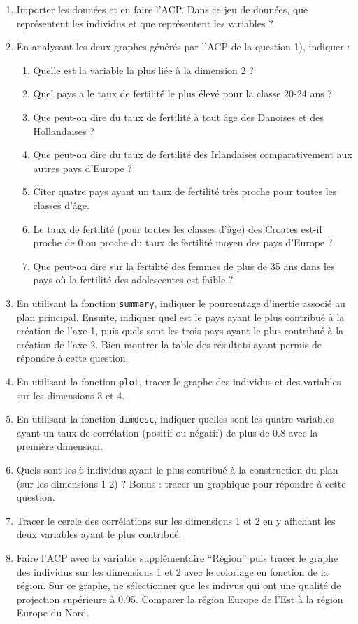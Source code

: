 \documentclass[
]{article}
\begin{document}
\begin{enumerate}
\def\labelenumi{\arabic{enumi})}
\item
  Importer les données et en faire l'ACP. Dans ce jeu de données, que
  représentent les individus et que représentent les variables ?
\item
  En analysant les deux graphes générés par l'ACP de la question 1),
  indiquer :

  \begin{enumerate}
  \def\labelenumii{\alph{enumii}.}
  \item
    Quelle est la variable la plus liée à la dimension 2 ?
  \item
    Quel pays a le taux de fertilité le plus élevé pour la classe 20-24
    ans ?
  \item
    Que peut-on dire du taux de fertilité à tout âge des Danoises et des
    Hollandaises ?
  \item
    Que peut-on dire du taux de fertilité des Irlandaises
    comparativement aux autres pays d'Europe ?
  \item
    Citer quatre pays ayant un taux de fertilité très proche pour toutes
    les classes d'âge.
  \item
    Le taux de fertilité (pour toutes les classes d'âge) des Croates
    est-il proche de 0 ou proche du taux de fertilité moyen des pays
    d'Europe ?
  \item
    Que peut-on dire sur la fertilité des femmes de plus de 35 ans dans
    les pays où la fertilité des adolescentes est faible ?
  \end{enumerate}
\item
  En utilisant la fonction \texttt{summary}, indiquer le pourcentage
  d'inertie associé au plan principal. Ensuite, indiquer quel est le
  pays ayant le plus contribué à la création de l'axe 1, puis quels sont
  les trois pays ayant le plus contribué à la création de l'axe 2. Bien
  montrer la table des résultats ayant permis de répondre à cette
  question.
\item
  En utilisant la fonction \texttt{plot}, tracer le graphe des individus
  et des variables sur les dimensions 3 et 4.
\item
  En utilisant la fonction \texttt{dimdesc}, indiquer quelles sont les
  quatre variables ayant un taux de corrélation (positif ou négatif) de
  plus de 0.8 avec la première dimension.
\item
  Quels sont les 6 individus ayant le plus contribué à la construction
  du plan (sur les dimensions 1-2) ? Bonus : tracer un graphique pour
  répondre à cette question.
\item
  Tracer le cercle des corrélations sur les dimensions 1 et 2 en y
  affichant les deux variables ayant le plus contribué.
\item
  Faire l'ACP avec la variable supplémentaire ``Région'' puis tracer le
  graphe des individus sur les dimensions 1 et 2 avec le coloriage en
  fonction de la région. Sur ce graphe, ne sélectionner que les indivus
  qui ont une qualité de projection supérieure à 0.95. Comparer la
  région Europe de l'Est à la région Europe du Nord.
\end{enumerate}
\end{document}
